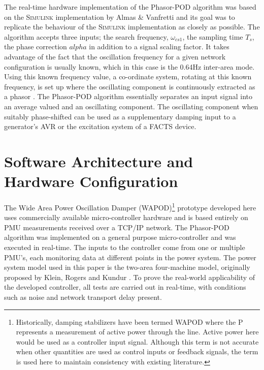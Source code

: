 \documentclass[journal]{IEEEtran}
\begin{document}
The real-time hardware implementation of the Phasor-POD algorithm was based on the \textsc{Simulink} implementation by Almas \& Vanfretti \cite{PhasorPODImplement} and its goal was to replicate the behaviour of the \textsc{Simulink} implementation as closely as possible. The algorithm accepts three inputs; the search frequency, $\omega_{cs1}$, the sampling time $T_{s}$, the phase correction $alpha$ in addition to a signal scaling factor. It takes advantage of the fact that the oscillation frequency for a given network configuration is usually known, which in this case is the 0.64Hz inter-area mode. Using this known frequency value, a  co-ordinate system, rotating at this known frequency, is set up where the oscillating component is continuously extracted as a phasor \cite{PhasorPOD}. The Phasor-POD algorithm essentially separates an input signal into an average valued and an oscillating component. The oscillating component when suitably phase-shifted can be used as a supplementary damping input to a generator's AVR or the excitation system of a FACTS device.
\section{Software Architecture and Hardware Configuration}\label{softhardware}

The Wide Area Power Oscillation Damper (WAPOD)\footnote{Historically, damping stabilizers have been termed WAPOD where the P represents a measurement of active power through the line. Active power here would be used as a controller input signal. Although this term is not accurate when other quantities are used as control inputs or feedback signals, the term is used here to maintain consistency with existing literature.} prototype developed here uses commercially available micro-controller hardware and is based entirely on PMU measurements received over a TCP/IP network. The Phasor-POD algorithm \cite{PhasorPOD} was implemented on a general purpose micro-controller and was executed in real-time. The inputs to the controller come from one or multiple PMU's, each monitoring data at different points in the power system. The power system model used in this paper is the two-area four-machine model, originally proposed by Klein, Rogers and Kundur \cite{KundurTwoArea}. To prove the real-world applicability of the developed controller, all tests are carried out in real-time, with conditions such as noise and network transport delay present.
\end{document}
